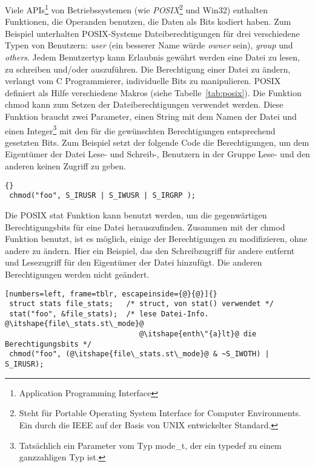 Viele APIs\footnote{Application Programming Interface} 
von Betriebssystemen (wie \emph{POSIX}\footnote{Steht f\"{u}r Portable
Operating System Interface for Computer Environments. Ein durch die
IEEE auf der Basis von UNIX entwickelter Standard.} und Win32)
enthalten Funktionen, die Operanden benutzen, die Daten als Bits
kodiert haben. Zum Beispiel unterhalten POSIX-Systeme
Dateiberechtigungen f\"{u}r drei verschiedene Typen von Benutzern:
\emph{user} (ein besserer Name w\"{u}rde \emph{owner} sein),
\emph{group} und \emph{others}. Jedem Benutzertyp kann Erlaubnis
gew\"{a}hrt werden eine Datei zu lesen, zu schreiben und/oder
auszuf\"{u}hren. Die Berechtigung einer Datei zu \"{a}ndern, verlangt vom C
Programmierer, individuelle Bits zu manipulieren. POSIX definiert
als Hilfe verschiedene Makros (siehe Tabelle~\ref{tab:posix}). Die
Funktion {\code chmod}  kann zum Setzen der
Dateiberechtigungen verwendet werden. Diese Funktion braucht zwei
Parameter, einen String mit dem Namen der Datei und einen
Integer\footnote{Tats\"{a}chlich ein Parameter vom Typ {\code mode\_t},
der ein typedef zu einem ganzzahligen Typ ist.}  mit den f\"{u}r die
gew\"{u}nschten Berechtigungen entsprechend gesetzten Bits. Zum Beispiel
setzt der folgende Code die Berechtigungen, um dem Eigent\"{u}mer der
Datei Lese- und Schreib-, Benutzern in der Gruppe Lese- und den
anderen keinen Zugriff zu geben.
\begin{lstlisting}[stepnumber=0]{}
 chmod("foo", S_IRUSR | S_IWUSR | S_IRGRP );
\end{lstlisting}

Die POSIX {\code stat} Funktion  kann benutzt werden,
um die gegenw\"{a}rtigen Berechtigungsbits f\"{u}r eine Datei
herauszufinden. Zusammen mit der {\code chmod} Funktion benutzt, ist
es m\"{o}glich, einige der Berechtigungen zu modifizieren, ohne andere
zu \"{a}ndern. Hier ein Beispiel, das den Schreibzugriff f\"{u}r andere
entfernt und Lesezugriff f\"{u}r den Eigent\"{u}mer der Datei hinzuf\"{u}gt. Die
anderen Berechtigungen werden nicht ge\"{a}ndert.
\begin{lstlisting}[numbers=left, frame=tblr, escapeinside={@}{@}]{}
 struct stats file_stats;   /* struct, von stat() verwendet */
 stat("foo", &file_stats);  /* lese Datei-Info. @\itshape{file\_stats.st\_mode}@
                               @\itshape{enth\"{a}lt}@ die Berechtigungsbits */
 chmod("foo", (@\itshape{file\_stats.st\_mode}@ & ~S_IWOTH) | S_IRUSR);
\end{lstlisting}

